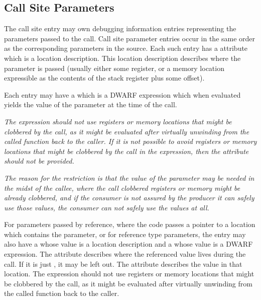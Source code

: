 \subsection{Call Site Parameters}
\label{chap:callsiteparameters}
The call site entry may own 
\DWTAGcallsiteparameterTARG{} 
debugging information entries representing the parameters passed 
to the call.
Call site parameter entries occur in the same order as the 
corresponding parameters in the source.
Each such entry has a \DWATlocation{} attribute which is a location 
description. This location description 
describes where the parameter is passed
(usually either some register, or a memory location expressible as 
the contents of the stack register plus some offset).

Each \DWTAGcallsiteparameter{} entry may have a 
\DWATcallvalueDEFN{}
which is a DWARF expression 
which when evaluated yields the value of the parameter at the time of the call.

\textit{The expression should not use registers or memory
locations that might be clobbered by the call, as it might be evaluated after 
virtually unwinding from the called function back to the caller.  If it is not
possible to avoid registers or memory locations that might be clobbered by
the call in the expression, then the \DWATcallvalueNAME{} attribute should
not be provided.}

\textit{The reason for the restriction is that the value of the parameter may be
needed in the midst of the callee, where the call clobbered registers or
memory might be already clobbered, and if the consumer is not assured by
the producer it can safely use those values, the consumer can not safely
use the values at all.}

For parameters passed by reference, where the code passes a pointer to
a location which contains the parameter, or for reference type parameters,
the \DWTAGcallsiteparameter{} entry may also have a
\DWATcalldatalocationDEFN{}
whose value is a location description and a
\DWATcalldatavalueDEFN{}
whose value is a DWARF expression.  The \DWATcalldatalocationNAME{} attribute
describes where the referenced value lives during the call.  If it is just 
\DWOPpushobjectaddress{}, it may be left out.  The 
\DWATcalldatavalueNAME{} attribute describes the value in that location. 
The expression should not use registers or memory
locations that might be clobbered by the call, as it might be evaluated after 
virtually unwinding from the called function back to the caller.

